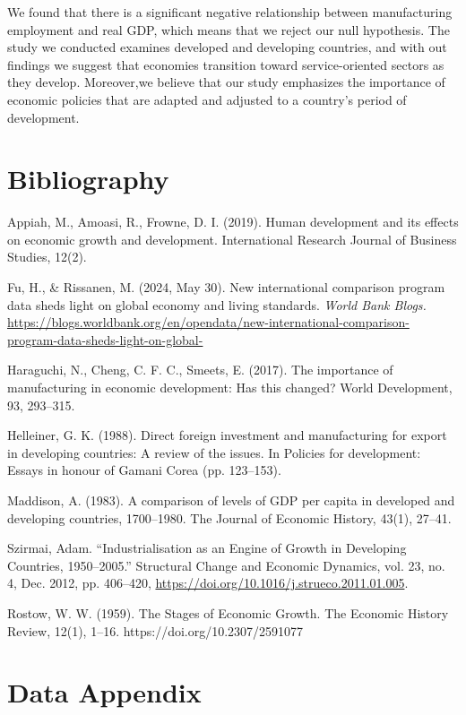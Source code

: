 \documentclass[12pt]{article}
\begin{document}
We found that there is a significant negative relationship between manufacturing employment and real GDP, which means that we reject our null hypothesis. The study we conducted examines developed and developing countries, and with out findings we suggest that economies transition toward service-oriented sectors as they develop. Moreover,we believe that our study emphasizes the importance of economic policies that are adapted and adjusted to a country's period of development. 
\newpage
\section*{Bibliography}
\singlespacing
\setlength\bibsep{0pt}

Appiah, M., Amoasi, R., Frowne, D. I. (2019). Human development and its effects on economic growth and development. International Research Journal of Business Studies, 12(2).

Fu, H., \& Rissanen, M. (2024, May 30). New international comparison program data sheds light on global economy and living standards. \textit{World Bank Blogs.} \href{https://blogs.worldbank.org/en/opendata/new-international-comparison-program-data-sheds-light-on-global-}{https://blogs.worldbank.org/en/opendata/new-international-comparison-program-data-sheds-light-on-global-}

Haraguchi, N., Cheng, C. F. C., Smeets, E. (2017). The importance of manufacturing in economic development: Has this changed? World Development, 93, 293–315.

Helleiner, G. K. (1988). Direct foreign investment and manufacturing for export in developing countries: A review of the issues. In Policies for development: Essays in honour of Gamani Corea (pp. 123–153).

Maddison, A. (1983). A comparison of levels of GDP per capita in developed and developing countries, 1700–1980. The Journal of Economic History, 43(1), 27–41.

Szirmai, Adam. “Industrialisation as an Engine of Growth in Developing Countries, 1950–2005.” Structural Change and Economic Dynamics, vol. 23, no. 4, Dec. 2012, pp. 406–420, \href{https://doi.org/10.1016/j.strueco.2011.01.005}{https://doi.org/10.1016/j.strueco.2011.01.005}.

Rostow, W. W. (1959). The Stages of Economic Growth. The Economic History Review, 12(1), 1–16. https://doi.org/10.2307/2591077


\newpage
\section*{Data Appendix} \label{sec:appendixa}
\end{document}
